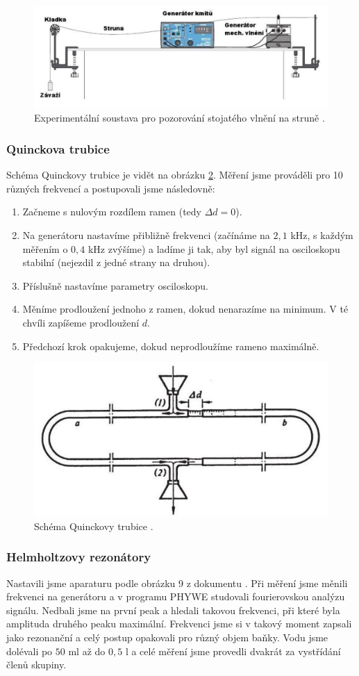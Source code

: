 \documentclass[english]{article}
\begin{document}
		\begin{figure}
		 	\centering
		 	\includegraphics[width=.53\linewidth]{att/s_struna.jpg}
			\caption{Experimentální soustava pro pozorování stojatého vlnění na struně \cite{bib:zadani}.}
		    \label{fig:s_struna}
		\end{figure}
		
	\subsubsection{Quinckova trubice}
		Schéma Quinckovy trubice je vidět na obrázku \ref{fig:s_quinck}. Měření jsme prováděli pro 10 různých frekvencí a postupovali jsme následovně:
		\begin{enumerate}
			\item Začneme s nulovým rozdílem ramen (tedy $\Delta d=0$).
			\item Na generátoru nastavíme přibližně frekvenci (začínáme na $2,1$ kHz, s každým měřením o $0,4$ kHz zvýšíme) a ladíme ji tak, aby byl signál na osciloskopu stabilní (nejezdil z jedné strany na druhou).
			\item Příslušně nastavíme parametry osciloskopu.
			\item Měníme prodloužení jednoho z ramen, dokud nenarazíme na minimum. V té chvíli zapíšeme prodloužení $d$.
			\item Předchozí krok opakujeme, dokud neprodloužíme rameno maximálně.
		\end{enumerate}
		
		\begin{figure}
		 	\centering
		 	\includegraphics[width=.53\linewidth]{att/s_quinck.jpg}
			\caption{Schéma Quinckovy trubice \cite{bib:zadani}.}
		    \label{fig:s_quinck}
		\end{figure}		
	
	\subsubsection{Helmholtzovy rezonátory}
		Nastavili jsme aparaturu podle obrázku 9 z dokumentu \cite{bib:zadani}. Při měření jsme měnili frekvenci na generátoru a v programu PHYWE \cite{bib:phywe} studovali fourierovskou analýzu signálu. Nedbali jsme na první peak a hledali takovou frekvenci, při které byla amplituda druhého peaku maximální. Frekvenci jsme si v takový moment zapsali jako rezonanční a celý postup opakovali pro různý objem baňky. Vodu jsme dolévali po $50$ ml až do $0,5$ l a celé měření jsme provedli dvakrát za vystřídání členů skupiny.
		
\end{document}
